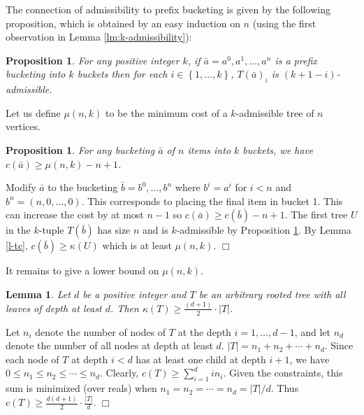 \documentclass[11pt]{article}
\newtheorem{lemma}[theorem]{Lemma}
\newtheorem{proposition}[theorem]{Proposition}
\newcommand{\qed}{$\Box$}
\newenvironment{proof}{\noindent {\bf Proof:}}{\hfill \qed \smallskip}
\newcommand{\natInt}[2]{ \left\{ #1, \dotsc, #2 \right\} }
\begin{document}
The connection of admissibility to prefix bucketing is given by the following proposition, which is obtained by 
an easy induction on $n$ (using the first observation in Lemma \ref{lm:k-admissibility}):


\begin{proposition}\label{p-ta}
For any positive integer $k$, if $\bar{a} = a^0,a^1,\dotsc,a^n$ is a prefix bucketing into $k$ buckets then
for each $i \in \natInt{1}{k}$, $T(\bar{a})_i$ is $(k+1-i)$-admissible.
\end{proposition}

Let us define $\mu(n,k)$ to be the minimum cost of a $k$-admissible tree of $n$ vertices.

\begin{proposition}
\label{prop:mu}
For any bucketing $\bar{a}$ of $n$ items into $k$ buckets, we have $c(\bar{a}) \geq \mu(n,k) - n+1$.
\end{proposition}

\begin{proof}
Modify $\bar{a}$ to the bucketing $\bar{b}=b^0,\ldots,b^n$ where $b^i=a^i$
for $i<n$ and $b^n=(n,0,\ldots,0)$.  This corresponds to placing the final item in bucket 1.
This can increase the cost by at most $n-1$ so
 $c(\bar{a}) \geq c(\bar{b}) - n+1$.  The first tree $U$ in the  $k$-tuple  $T(\bar{b})$ has  size $n$ and is $k$-admissible
by Proposition \ref{p-ta}.  By  Lemma \ref{l-tc}, $c(\bar{b}) \geq \kappa(U)$ which
is at least $\mu(n,k)$.  
\end{proof}

It remains to give a  lower bound on $\mu(n,k)$.  

\begin{lemma}
\label{lm:k-d-cost}
Let $d$ be a positive integer and $T$ be an arbitrary rooted tree with all leaves of depth at least $d$. Then 
$\kappa(T) \geq \frac{(d + 1)}{2} \cdot |T|$.
\end{lemma}
\begin{proof} %
Let $n_i$ denote the number of nodes of $T$ at the depth $i = 1, \dotsc, d - 1$, and let $n_d$ denote the number of all nodes at depth at least $d$. $|T|=n_1+n_2 + \dotsb + n_d$.
Since each node of $T$ at depth $i<d$ has at least one child at depth $i+1$, we have $0\leq n_1 \leq n_2 \leq \dotsb \leq n_d$.
Clearly, $c(T) \geq \sum_{i=1}^d in_i$.
Given the constraints, this sum is minimized (over reals) when $n_1=n_2=\dotsb =n_d = |T| / d $. Thus $c(T) \geq \frac{d(d + 1)}{2} \cdot \frac{|T|}{d}$.
\end{proof}
\end{document}
